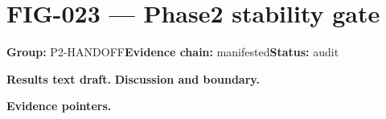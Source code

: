 \clearpage
\section{FIG-023 --- Phase2 stability gate}
\label{figpage:fig-023}
\textbf{Group:} P2-HANDOFF\quad \textbf{Evidence chain:} manifested\quad \textbf{Status:} audit

\textbf{Results text draft.} 
\textbf{Discussion and boundary.} 


\textbf{Evidence pointers.}



\vfill
